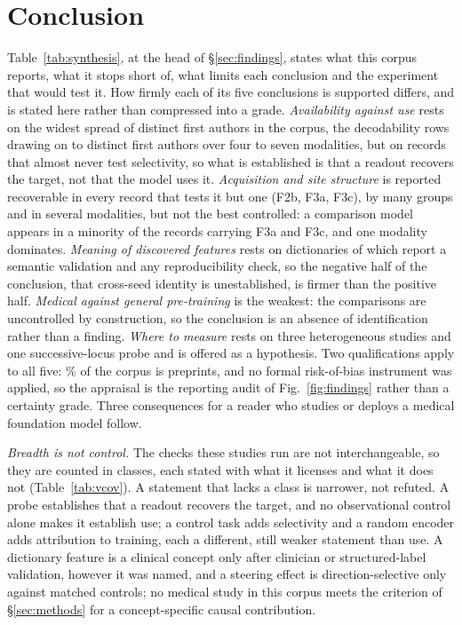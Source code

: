 \section{Conclusion}
\label{sec:conclusion}

Table~\ref{tab:synthesis}, at the head of \S\ref{sec:findings}, states what this corpus reports, what it
stops short of, what limits each conclusion and the experiment that would test it. How firmly each of its
five conclusions is supported differs, and is stated here rather than compressed into a grade.
\emph{Availability against use} rests on the widest spread of distinct first authors in the corpus, the decodability rows drawing on \Fdecgrpmin{} to \Fdecgrpmax{} distinct first authors over four to seven modalities, but on records that almost never test selectivity, so what is established is that a readout recovers the target, not that the model uses it. \emph{Acquisition and site structure} is reported
recoverable in every record that tests it but one (F2b, F3a, F3c), by many groups and in several
modalities, but not the best controlled: a comparison model appears in a minority of the records carrying F3a and F3c, and one
modality dominates. \emph{Meaning of discovered features} rests on \Nsae{} dictionaries of which
\Nsaeval{} report a semantic validation and \Nsaestab{} any reproducibility check, so the negative half of
the conclusion, that cross-seed identity is unestablished, is firmer than the positive half.
\emph{Medical against general pre-training} is the weakest: the comparisons are uncontrolled by
construction, so the conclusion is an absence of identification rather than a finding. \emph{Where to
measure} rests on three heterogeneous studies and one successive-locus probe and is offered as a
hypothesis. Two qualifications apply to all five: \Pctpreprint\% of the corpus is preprints,
and no formal risk-of-bias instrument was applied, so the appraisal is the reporting audit of
Fig.~\ref{fig:findings} rather than a certainty grade. Three consequences for a reader who studies or
deploys a medical foundation model follow.

\emph{Breadth is not control.} The checks these studies run are not interchangeable, so they are counted
in \Vnclasses{} classes, each stated with what it licenses and what it does not (Table~\ref{tab:vcov}).
A statement that lacks a class is narrower, not refuted. A probe establishes that a readout recovers
the target, and no observational control alone makes it establish use; a control task adds selectivity and a random encoder
adds attribution to training, each a different, still weaker statement than use. A dictionary feature is
a clinical concept only after clinician or structured-label validation, however it was named, and a
steering effect is direction-selective only against matched controls; no medical study in this corpus
meets the criterion of \S\ref{sec:methods} for a concept-specific causal contribution.


